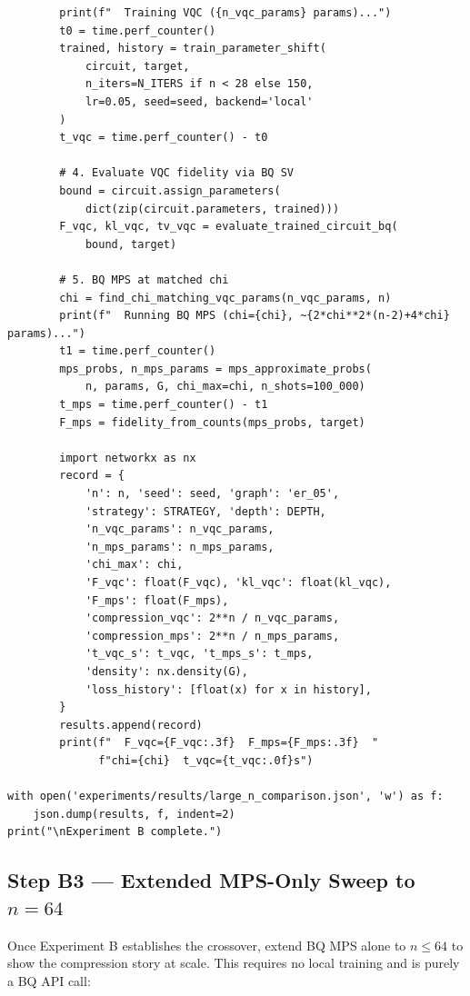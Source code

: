 \documentclass[11pt]{article}
\begin{document}
\begin{lstlisting}
        print(f"  Training VQC ({n_vqc_params} params)...")
        t0 = time.perf_counter()
        trained, history = train_parameter_shift(
            circuit, target,
            n_iters=N_ITERS if n < 28 else 150,
            lr=0.05, seed=seed, backend='local'
        )
        t_vqc = time.perf_counter() - t0

        # 4. Evaluate VQC fidelity via BQ SV
        bound = circuit.assign_parameters(
            dict(zip(circuit.parameters, trained)))
        F_vqc, kl_vqc, tv_vqc = evaluate_trained_circuit_bq(
            bound, target)

        # 5. BQ MPS at matched chi
        chi = find_chi_matching_vqc_params(n_vqc_params, n)
        print(f"  Running BQ MPS (chi={chi}, ~{2*chi**2*(n-2)+4*chi} params)...")
        t1 = time.perf_counter()
        mps_probs, n_mps_params = mps_approximate_probs(
            n, params, G, chi_max=chi, n_shots=100_000)
        t_mps = time.perf_counter() - t1
        F_mps = fidelity_from_counts(mps_probs, target)

        import networkx as nx
        record = {
            'n': n, 'seed': seed, 'graph': 'er_05',
            'strategy': STRATEGY, 'depth': DEPTH,
            'n_vqc_params': n_vqc_params,
            'n_mps_params': n_mps_params,
            'chi_max': chi,
            'F_vqc': float(F_vqc), 'kl_vqc': float(kl_vqc),
            'F_mps': float(F_mps),
            'compression_vqc': 2**n / n_vqc_params,
            'compression_mps': 2**n / n_mps_params,
            't_vqc_s': t_vqc, 't_mps_s': t_mps,
            'density': nx.density(G),
            'loss_history': [float(x) for x in history],
        }
        results.append(record)
        print(f"  F_vqc={F_vqc:.3f}  F_mps={F_mps:.3f}  "
              f"chi={chi}  t_vqc={t_vqc:.0f}s")

with open('experiments/results/large_n_comparison.json', 'w') as f:
    json.dump(results, f, indent=2)
print("\nExperiment B complete.")
\end{lstlisting}

\subsection{Step B3 --- Extended MPS-Only Sweep to $n = 64$}

Once Experiment B establishes the crossover, extend BQ MPS alone
to $n \leq 64$ to show the compression story at scale.
This requires no local training and is purely a BQ API call:
\end{document}
